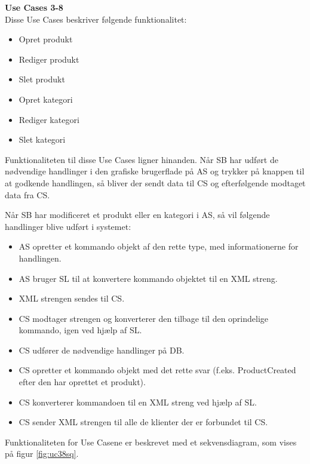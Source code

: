 \textbf{Use Cases 3-8}\\
Disse Use Cases beskriver følgende funktionalitet:
\begin{itemize}
	\item Opret produkt
	\item Rediger produkt
	\item Slet produkt
	\item Opret kategori
	\item Rediger kategori
	\item Slet kategori
\end{itemize}
Funktionaliteten til disse Use Cases ligner hinanden. Når \gls{SB} har udført de nødvendige handlinger i den grafiske brugerflade på \gls{AS} og trykker på knappen til at godkende handlingen, så bliver der sendt data til \gls{CS} og efterfølgende modtaget data fra \gls{CS}.

Når \gls{SB} har modificeret et produkt eller en kategori i \gls{AS}, så vil følgende handlinger blive udført i systemet:
\begin{itemize}
	\item \gls{AS} opretter et kommando objekt af den rette type, med informationerne for handlingen.
	\item \gls{AS} bruger \gls{SL} til at konvertere kommando objektet til en XML streng.
	\item XML strengen sendes til \gls{CS}.
	\item \gls{CS} modtager strengen og konverterer den tilbage til den oprindelige kommando, igen ved hjælp af \gls{SL}.
	\item \gls{CS} udfører de nødvendige handlinger på \gls{DB}.
	\item \gls{CS} opretter et kommando objekt med det rette svar (f.eks. ProductCreated efter den har oprettet et produkt).
	\item \gls{CS} konverterer kommandoen til en XML streng ved hjælp af \gls{SL}.
	\item \gls{CS} sender XML strengen til alle de klienter der er forbundet til \gls{CS}.
\end{itemize}

Funktionaliteten for Use Casene er beskrevet med et sekvensdiagram, som vises på figur \ref{fig:uc38sq}.

